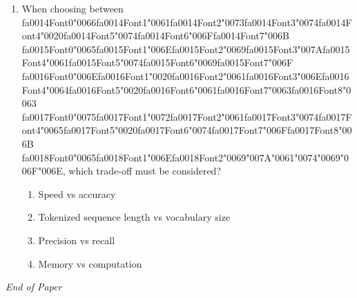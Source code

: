 \documentclass[12pt]{article}
\begin{document}
\begin{enumerate}[label=Q\arabic*.]
\begin{enumerate}[label=(\Alph*)]
    \item It does not support multiple entity types
    \item It ignores entity boundaries
\end{enumerate}
\item When choosing between {\csname fa0014Font0\endcsname\char"0066}{\csname fa0014Font1\endcsname\char"0061}{\csname fa0014Font2\endcsname\char"0073}{\csname fa0014Font3\endcsname\char"0074}{\csname fa0014Font4\endcsname\char"0020}{\csname fa0014Font5\endcsname\char"0074}{\csname fa0014Font6\endcsname\char"006F}{\csname fa0014Font7\endcsname\char"006B} {\csname fa0015Font0\endcsname\char"0065}{\csname fa0015Font1\endcsname\char"006E}{\csname fa0015Font2\endcsname\char"0069}{\csname fa0015Font3\endcsname\char"007A}{\csname fa0015Font4\endcsname\char"0061}{\csname fa0015Font5\endcsname\char"0074}{\csname fa0015Font6\endcsname\char"0069}{\csname fa0015Font7\endcsname\char"006F} {\csname fa0016Font0\endcsname\char"006E}{\csname fa0016Font1\endcsname\char"0020}{\csname fa0016Font2\endcsname\char"0061}{\csname fa0016Font3\endcsname\char"006E}{\csname fa0016Font4\endcsname\char"0064}{\csname fa0016Font5\endcsname\char"0020}{\csname fa0016Font6\endcsname\char"0061}{\csname fa0016Font7\endcsname\char"0063}{\csname fa0016Font8\endcsname\char"0063} {\csname fa0017Font0\endcsname\char"0075}{\csname fa0017Font1\endcsname\char"0072}{\csname fa0017Font2\endcsname\char"0061}{\csname fa0017Font3\endcsname\char"0074}{\csname fa0017Font4\endcsname\char"0065}{\csname fa0017Font5\endcsname\char"0020}{\csname fa0017Font6\endcsname\char"0074}{\csname fa0017Font7\endcsname\char"006F}{\csname fa0017Font8\endcsname\char"006B} {\csname fa0018Font0\endcsname\char"0065}{\csname fa0018Font1\endcsname\char"006E}{\csname fa0018Font2\endcsname\char"0069}{\char"007A}{\char"0061}{\char"0074}{\char"0069}{\char"006F}{\char"006E}, which trade-off must be considered?
\begin{enumerate}[label=(\Alph*)]
    \item Speed vs accuracy
    \item Tokenized sequence length vs vocabulary size
    \item Precision vs recall
    \item Memory vs computation
\end{enumerate}
\end{enumerate}

\vfill
\noindent\textit{End of Paper}
\end{document}
